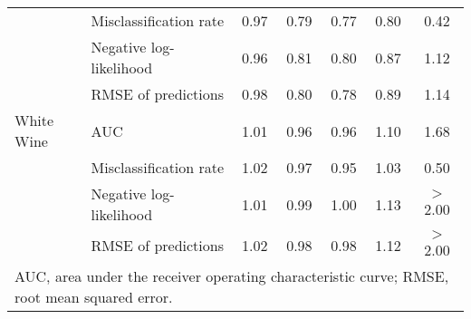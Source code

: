 \begin{table*}[ht]
\begin{tabular}{llccccc}
   & Misclassification rate & 0.97 & 0.79 & 0.77 & 0.80 & 0.42 \\ 
   & Negative log-likelihood & 0.96 & 0.81 & 0.80 & 0.87 & 1.12 \\ 
   & RMSE of predictions & 0.98 & 0.80 & 0.78 & 0.89 & 1.14 \\ 
   \hline
White Wine & AUC & 1.01 & 0.96 & 0.96 & 1.10 & 1.68 \\ 
   & Misclassification rate & 1.02 & 0.97 & 0.95 & 1.03 & 0.50 \\ 
   & Negative log-likelihood & 1.01 & 0.99 & 1.00 & 1.13 & $>$2.00 \\ 
   & RMSE of predictions & 1.02 & 0.98 & 0.98 & 1.12 & $>$2.00 \\ 
   \hline \multicolumn{7}{l}{\small AUC, area under the receiver operating characteristic curve; RMSE, root mean squared error.} \\ \hline
\end{tabular}
\end{table*}
